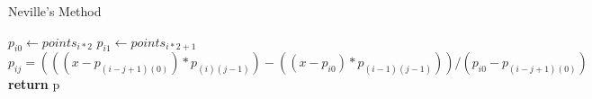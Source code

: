 \documentclass{article}
\begin{document}
  \begin{algorithm}
    \caption{Neville's Method}
    \begin{algorithmic}[1]
        \State $p_{i0} \gets points_{i * 2}$
        \State $p_{i1} \gets points_{i * 2 + 1}$
      \EndFor
          \State $p_{ij} = (((x - p_{(i - j + 1)(0)}) * p_{(i)(j - 1)}) -
                        ((x - p_{i0}) * p_{(i - 1)(j - 1)}))
                        / (p_{i0} - p_{(i - j + 1)(0)})$
        \EndFor
      \EndFor
      \State \textbf{return} p
      \EndProcedure
    \end{algorithmic}
  \end{algorithm}
\end{document}
